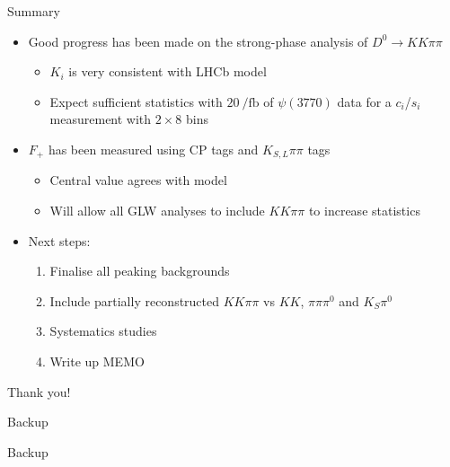 \documentclass{beamer}
\begin{document}
\begin{frame}{Summary}
  \begin{itemize}
    \setlength\itemsep{1.0em}
    \item{Good progress has been made on the strong-phase analysis of $D^0\to KK\pi\pi$}
    \begin{itemize}
      \item{$K_i$ is very consistent with LHCb model}
      \item{Expect sufficient statistics with $\SI{20}{\per\femto\barn}$ of $\psi(3770)$ data for a $c_i$/$s_i$ measurement with $2\times 8$ bins}
    \end{itemize}
    \item{$F_+$ has been measured using CP tags and $K_{S, L}\pi\pi$ tags}
    \begin{itemize}
      \item{Central value agrees with model}
      \item{Will allow all GLW analyses to include $KK\pi\pi$ to increase statistics}
    \end{itemize}
    \item{Next steps:}
    \begin{enumerate}
      \item{Finalise all peaking backgrounds}
      \item{Include partially reconstructed $KK\pi\pi$ vs $KK$, $\pi\pi\pi^0$ and $K_S\pi^0$}
      \item{Systematics studies}
      \item{Write up MEMO}
    \end{enumerate}
  \end{itemize}
  \begin{center}
    {\huge Thank you!}
  \end{center}
\end{frame}

\begin{frame}{Backup}
  \begin{center}
    {\huge Backup}
  \end{center}
\end{frame}
\end{document}
